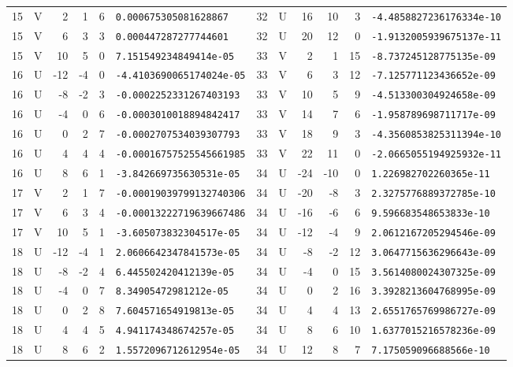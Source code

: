 \begin{longtable}{rcrrrl|rcrrrl}
15 & V & 2 & 1 & 6 & \texttt{0.000675305081628867} & 32 & U & 16 & 10 & 3 & \texttt{-4.4858827236176334e-10}\\
15 & V & 6 & 3 & 3 & \texttt{0.000447287277744601} & 32 & U & 20 & 12 & 0 & \texttt{-1.9132005939675137e-11}\\
15 & V & 10 & 5 & 0 & \texttt{7.151549234849414e-05} & 33 & V & 2 & 1 & 15 & \texttt{-8.737245128775135e-09}\\
16 & U & -12 & -4 & 0 & \texttt{-4.4103690065174024e-05} & 33 & V & 6 & 3 & 12 & \texttt{-7.125771123436652e-09}\\
16 & U & -8 & -2 & 3 & \texttt{-0.0002252331267403193} & 33 & V & 10 & 5 & 9 & \texttt{-4.513300304924658e-09}\\
16 & U & -4 & 0 & 6 & \texttt{-0.0003010018894842417} & 33 & V & 14 & 7 & 6 & \texttt{-1.958789698711717e-09}\\
16 & U & 0 & 2 & 7 & \texttt{-0.0002707534039307793} & 33 & V & 18 & 9 & 3 & \texttt{-4.3560853825311394e-10}\\
16 & U & 4 & 4 & 4 & \texttt{-0.00016757525545661985} & 33 & V & 22 & 11 & 0 & \texttt{-2.0665055194925932e-11}\\
16 & U & 8 & 6 & 1 & \texttt{-3.842669735630531e-05} & 34 & U & -24 & -10 & 0 & \texttt{1.226982702260365e-11}\\
17 & V & 2 & 1 & 7 & \texttt{-0.00019039799132740306} & 34 & U & -20 & -8 & 3 & \texttt{2.3275776889372785e-10}\\
17 & V & 6 & 3 & 4 & \texttt{-0.00013222719639667486} & 34 & U & -16 & -6 & 6 & \texttt{9.596683548653833e-10}\\
17 & V & 10 & 5 & 1 & \texttt{-3.605073832304517e-05} & 34 & U & -12 & -4 & 9 & \texttt{2.0612167205294546e-09}\\
18 & U & -12 & -4 & 1 & \texttt{2.0606642347841573e-05} & 34 & U & -8 & -2 & 12 & \texttt{3.0647715636296643e-09}\\
18 & U & -8 & -2 & 4 & \texttt{6.445502420412139e-05} & 34 & U & -4 & 0 & 15 & \texttt{3.5614080024307325e-09}\\
18 & U & -4 & 0 & 7 & \texttt{8.34905472981212e-05} & 34 & U & 0 & 2 & 16 & \texttt{3.3928213604768995e-09}\\
18 & U & 0 & 2 & 8 & \texttt{7.604571654919813e-05} & 34 & U & 4 & 4 & 13 & \texttt{2.6551765769986727e-09}\\
18 & U & 4 & 4 & 5 & \texttt{4.941174348674257e-05} & 34 & U & 8 & 6 & 10 & \texttt{1.6377015216578236e-09}\\
18 & U & 8 & 6 & 2 & \texttt{1.5572096712612954e-05} & 34 & U & 12 & 8 & 7 & \texttt{7.175059096688566e-10}\\

\end{longtable}
